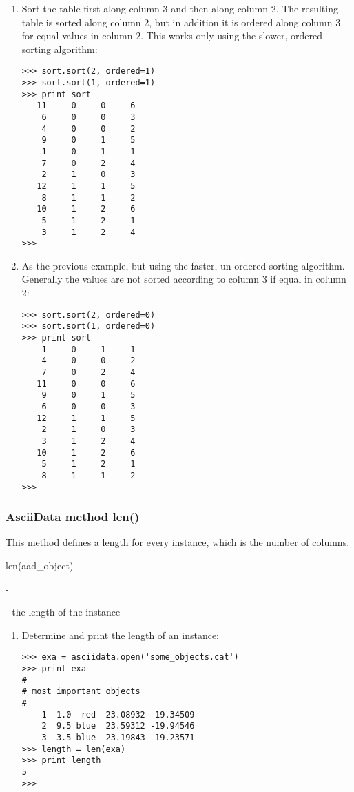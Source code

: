 \begin{enumerate}
\item Sort the table first along column 3 and then along column 2. The
resulting table is sorted along column 2, but in addition it is
ordered along column 3 for equal values in column 2.
This works only using the slower, ordered sorting algorithm:
\begin{small}
\begin{verbatim}
>>> sort.sort(2, ordered=1)
>>> sort.sort(1, ordered=1)
>>> print sort
   11     0     0     6
    6     0     0     3
    4     0     0     2
    9     0     1     5
    1     0     1     1
    7     0     2     4
    2     1     0     3
   12     1     1     5
    8     1     1     2
   10     1     2     6
    5     1     2     1
    3     1     2     4
>>>
\end{verbatim}
\end{small}
\item As the previous example, but using the faster, un-ordered sorting
algorithm. Generally the values are not sorted according  to column 3 if
equal in column 2:
\begin{small}
\begin{verbatim}
>>> sort.sort(2, ordered=0)
>>> sort.sort(1, ordered=0)
>>> print sort
    1     0     1     1
    4     0     0     2
    7     0     2     4
   11     0     0     6
    9     0     1     5
    6     0     0     3
   12     1     1     5
    2     1     0     3
    3     1     2     4
   10     1     2     6
    5     1     2     1
    8     1     1     2
>>>
\end{verbatim}
\end{small}
\end{enumerate}

\subsubsection{AsciiData method len()}
\label{adm_len}
%
This method defines a length for every \ad instance, which is the number
of columns.

len(aad\_object)

-

- the length of the \ad instance

\begin{enumerate}
\item Determine and print the length of an \ad instance:
\begin{small}
\begin{verbatim}
>>> exa = asciidata.open('some_objects.cat')
>>> print exa
#
# most important objects
#
    1  1.0  red  23.08932 -19.34509
    2  9.5 blue  23.59312 -19.94546
    3  3.5 blue  23.19843 -19.23571
>>> length = len(exa)
>>> print length
5
>>>
\end{verbatim}
\end{small}
\end{enumerate}

